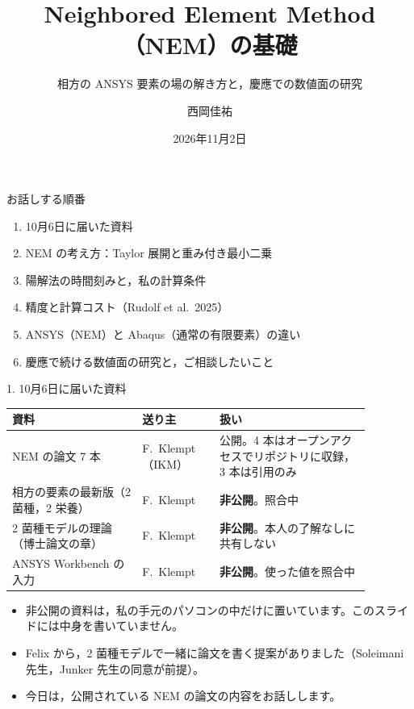 \documentclass[aspectratio=169,11pt]{beamer}
\title{Neighbored Element Method（NEM）の基礎}
\subtitle{相方の ANSYS 要素の場の解き方と，慶應での数値面の研究}
\author[西岡佳祐]{西岡佳祐}
\institute[IKM, LUH / 慶應]{%
\small ライプニッツ大学ハノーファー 連続体力学研究所（IKM）\\
\small 慶應義塾大学}
\date{2026年11月2日}
\begin{document}
\maketitle

\begin{frame}{お話しする順番}
\begin{enumerate}
  \item 10月6日に届いた資料
  \item NEM の考え方：Taylor 展開と重み付き最小二乗
  \item 陽解法の時間刻みと，私の計算条件
  \item 精度と計算コスト（Rudolf et al.\ 2025）
  \item ANSYS（NEM）と Abaqus（通常の有限要素）の違い
  \item 慶應で続ける数値面の研究と，ご相談したいこと
\end{enumerate}
\end{frame}

\begin{frame}{1. 10月6日に届いた資料}
\small
\begin{tabular}{p{0.32\linewidth}p{0.19\linewidth}p{0.37\linewidth}}
\toprule
資料 & 送り主 & 扱い \\
\midrule
NEM の論文 7 本 & F.\ Klempt（IKM） & 公開。4 本はオープンアクセスでリポジトリに収録，3 本は引用のみ \\
相方の要素の最新版（2 菌種，2 栄養） & F.\ Klempt & \textbf{非公開}。照合中 \\
2 菌種モデルの理論（博士論文の章） & F.\ Klempt & \textbf{非公開}。本人の了解なしに共有しない \\
ANSYS Workbench の入力 & F.\ Klempt & \textbf{非公開}。使った値を照合中 \\
\bottomrule
\end{tabular}

\vspace{8pt}
\begin{itemize}
  \item 非公開の資料は，私の手元のパソコンの中だけに置いています。このスライドには中身を書いていません。
  \item Felix から，2 菌種モデルで一緒に論文を書く提案がありました（Soleimani 先生，Junker 先生の同意が前提）。
  \item 今日は，公開されている NEM の論文の内容をお話しします。
\end{itemize}
\end{frame}
\end{document}
